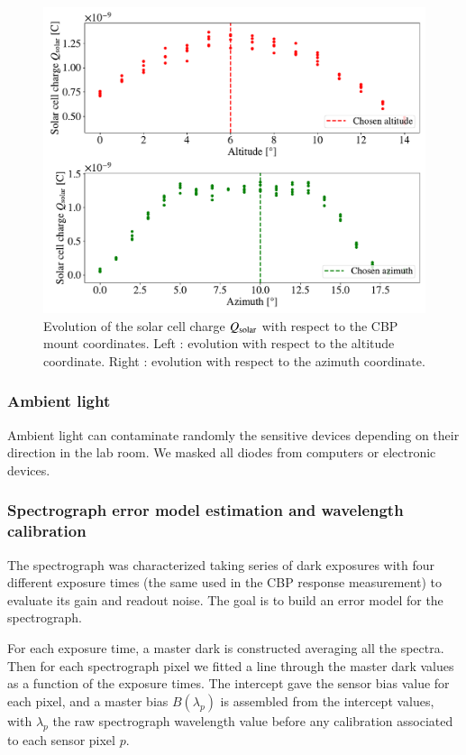 \begin{figure}[h]
    \centering
    \includegraphics[width=\columnwidth]{fig/cross_solarcell.pdf}
    \caption{Evolution of the solar cell charge $Q_{\mathrm{solar}}$ with respect to the CBP mount coordinates. Left : evolution with respect to the altitude coordinate. Right : evolution with respect to the azimuth coordinate.}
    \label{fig:cross_sc}
\end{figure}

\subsubsection{Ambient light}

Ambient light can contaminate randomly the sensitive devices depending on their direction in the lab room. We masked all diodes from computers or electronic devices.

\subsubsection{Spectrograph error model estimation and wavelength calibration}

The spectrograph was characterized taking series of dark exposures with four different exposure times (the same used in the CBP response measurement) to evaluate its gain and readout noise. The goal is to build an error model for the spectrograph.

For each exposure time, a master dark is constructed averaging all the spectra. Then for each spectrograph pixel we fitted a line through the master dark values as a function of the exposure times. The intercept gave the sensor bias value for each pixel, and a master bias $B(\lambda_p)$ is assembled from the intercept values, with $\lambda_p$ the raw spectrograph wavelength value before any calibration associated to each sensor pixel $p$. 

